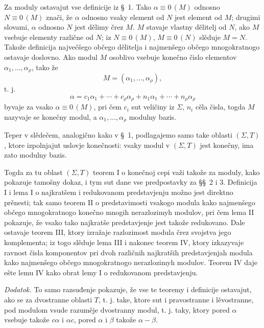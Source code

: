 \documentclass[11pt]{article}
\newcommand{\eqzero}[1]{\equiv 0\,(#1)}
\begin{document}
Za moduly ostavajut vse definicije iz \S~1. Tako \(\alpha\eqzero{M}\) odnosno \(N\eqzero{M}\) znači, že \(\alpha\) odnosno vsaky element od \(N\) jest element od \(M\); drugimi slovami, \(\alpha\) odnosno \(N\) jest dělimy črez \(M\). \(M\) stavaje vlastny dělitelj od \(N\), ako \(M\) vsebuje elementy različne od \(N\); iz \(N\eqzero{M}\), \(M\eqzero{N}\) slěduje \(M=N\). Takože definicija največšego občego dělitelja i najmenšego občego mnogokratnogo ostavaje doslovno. Ako modul \(M\) osoblivo vsebuje konečno čislo elementov \(\alpha_1,\ldots,\alpha_\rho\), tako že
\[
 M=(\alpha_1,\ldots,\alpha_\rho),
\]
t. j.
\[
 \alpha=c_1\alpha_1+\cdots+c_\rho\alpha_\rho
       +n_1\alpha_1+\cdots+n_\rho\alpha_\rho
\]
byvaje za vsako \(\alpha\eqzero{M}\), pri čem \(c_i\) sut veličiny iz \(\Sigma\), \(n_i\) cěla čisla, togda \(M\) nazyvaje se konečny modul, a \(\alpha_1,\ldots,\alpha_\rho\) modulny bazis.

Teper v slědečem, analogično kako v \S~1, podlagajemo samo take oblasti \((\Sigma,T)\), ktore izpolnjajut uslovje konečnosti: vsaky modul v \((\Sigma,T)\) jest konečny, ima zato modulny bazis.

Togda za tu oblast \((\Sigma,T)\) teorem I o konečnoj cepi važi takože za moduly, kako pokazuje tamošny dokaz, i tym sut dane vse predpostavky za \S\S~2 i 3. Definicija I i lema I o najkratšem i redukovanom predstavjenju možno jest direktno prěnesti; tak samo teorem II o predstavimosti vsakogo modula kako najmenšego občego mnogokratnogo konečno mnogih nerazlozimyh modulov, pri čem lema II pokazuje, že vsako tako najkratše predstavjenje jest takože redukovano. Dale ostavaje teorem III, ktory izražaje razlozimost modula črez svojstva jego komplementa; iz togo slěduje lema III i nakonec teorem IV, ktory izkazyvaje ravnost čisla komponentov pri dvoh različnih najkratših predstavjenjah modula kako najmenšego občego mnogokratnogo nerazlozimyh modulov. Teorem IV daje ešte lemu IV kako obrat lemy I o redukovanom predstavjenju.

\emph{Dodatok.} To samo razsuđenje pokazuje, že vse te teoremy i definicije ostavajut, ako se za dvostranne oblasti \(T\), t. j. take, ktore sut i pravostranne i lěvostranne, pod modulom vsude razuměje dvostranny modul, t. j. taky, ktory pored \(\alpha\) vsebuje takože \(c\alpha\) i \(\alpha c\), pored \(\alpha\) i \(\beta\) takože \(\alpha-\beta\).
\end{document}
